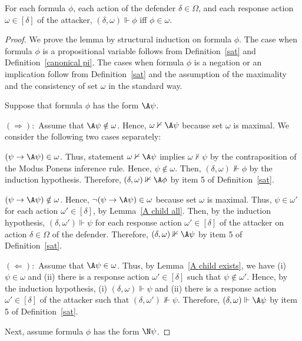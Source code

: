 \documentclass[letterpaper]{article}
\begin{document}
\begin{lemma}\label{truth lemma}
For each formula $\phi$, each action of the defender $\delta\in\Omega$, and each response action $\omega \in [\delta]$ of the attacker,
$(\delta,\omega)\Vdash\phi$ iff $\phi\in\omega$.

\end{lemma}
\begin{proof}
We prove the lemma by structural induction on formula $\phi$. The case when formula $\phi$ is a propositional variable follows from Definition~\ref{sat} and Definition~\ref{canonical pi}. The cases when formula $\phi$ is a negation or an implication follow from Definition~\ref{sat} and the assumption of the maximality and the consistency of set $\omega$ in the standard way.

Suppose that formula $\phi$ has the form $\A\psi$.

\noindent$(\Rightarrow):$ Assume that $\A\psi\notin\omega$. Hence, $\omega\nvdash\A\psi$ because set $\omega$ is maximal. We consider the following two cases separately:

 $(\psi\to\A\psi)\in \omega$. Thus, statement $\omega\nvdash\A\psi$ implies $\omega\nvdash\psi$ by the contraposition of the Modus Ponens inference rule. Hence, $\psi\not\in \omega$. Then, $(\delta,\omega)\nVdash\phi$ by the induction hypothesis. Therefore, $(\delta,\omega)\nVdash\A\phi$ by item 5 of Definition~\ref{sat}.

 $(\psi\to\A\psi)\notin \omega$. Hence, $\neg(\psi\to\A\psi)\in \omega$ because set $\omega$ is maximal. Thus, $\psi\in\omega'$ for each action $\omega'\in [\delta]$, by Lemma~\ref{A child all}. Then, by the induction hypothesis, $(\delta,\omega')\Vdash\psi$ for each response action $\omega'\in[\delta]$ of the attacker on action $\delta\in\Omega$ of the defender. Therefore, $(\delta,\omega)\nVdash\A\psi$ by item 5 of  Definition~\ref{sat}.

\noindent$(\Leftarrow):$ Assume that $\A\psi\in\omega$. Thus, by Lemma~\ref{A child exists}, we have
(i) $\psi\in\omega$ and
(ii) there is a response action $\omega'\in[\delta]$ such that $\psi\notin\omega'$.  Hence, by the induction hypothesis,
(i) $(\delta,\omega)\Vdash\psi$ and
(ii) there is a response action $\omega'\in[\delta]$ of the attacker such that $(\delta,\omega')\nVdash \psi$. Therefore, $(\delta,\omega)\Vdash\A\psi$ by item 5 of Definition~\ref{sat}.

Next, assume formula $\phi$ has the form $\N\psi$.


\end{proof}
\end{document}
